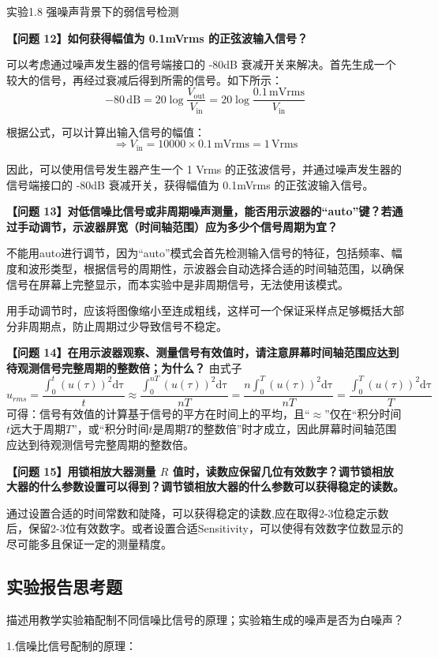 \documentclass[dvipsnames, svgnames,a4paper,11pt]{article}
\begin{document}
	实验1.8 \quad 强噪声背景下的弱信号检测

	\textbf{【问题 12】如何获得幅值为 0.1mVrms 的正弦波输入信号？}

可以考虑通过噪声发生器的信号端接口的 -80dB 衰减开关来解决。首先生成一个较大的信号，再经过衰减后得到所需的信号。如下所示：
\[
- 80 \, \mathrm{dB} = 20 \log \frac{V_{\text{out}}}{V_{\text{in}}} = 20 \log \frac{0.1 \, \mathrm{mVrms}}{V_{\text{in}}}
\]

根据公式，可以计算出输入信号的幅值：
\[
\Rightarrow V_{\text{in}} = 10000 \times 0.1 \, \mathrm{mVrms} = 1 \, \mathrm{Vrms}
\]

因此，可以使用信号发生器产生一个 1 Vrms 的正弦波信号，并通过噪声发生器的信号端接口的 -80dB 衰减开关，获得幅值为 0.1mVrms 的正弦波输入信号。

\textbf{【问题 13】对低信噪比信号或非周期噪声测量，能否用示波器的“auto”键？若通过手动调节，示波器屏宽（时间轴范围）应为多少个信号周期为宜？}

不能用auto进行调节，因为“auto”模式会首先检测输入信号的特征，包括频率、幅度和波形类型，根据信号的周期性，示波器会自动选择合适的时间轴范围，以确保信号在屏幕上完整显示，而本实验中是非周期信号，无法使用该模式。

用手动调节时，应该将图像缩小至连成粗线，这样可一个保证采样点足够概括大部分非周期点，防止周期过少导致信号不稳定。

\textbf{【问题 14】在用示波器观察、测量信号有效值时，请注意屏幕时间轴范围应达到待观测信号完整周期的整数倍；为什么？
}
由式子
\[
			u_{rms} = \frac{\int_0^{t} (u(\tau))^2 \mathrm{d\tau}}{t} \approx \frac{\int_0^{nT} (u(\tau))^2 \mathrm{d\tau}}{nT} = \frac{n\int_0^{T} (u(\tau))^2 \mathrm{d\tau}}{nT} = \frac{\int_0^{T} (u(\tau))^2 \mathrm{d\tau}}{T}
		\]
		可得：信号有效值的计算基于信号的平方在时间上的平均，且“$\approx$”仅在“积分时间$t$远大于周期$T$”，或“积分时间$t$是周期$T$的整数倍”时才成立，因此屏幕时间轴范围应达到待观测信号完整周期的整数倍。

\textbf{【问题 15】用锁相放大器测量 $R$ 值时，读数应保留几位有效数字？调节锁相放大器的什么参数设置可以得到？调节锁相放大器的什么参数可以获得稳定的读数。}

通过设置合适的时间常数和陡降，可以获得稳定的读数,应在取得2-3位稳定示数后，保留2-3位有效数字。或者设置合适Sensitivity，可以使得有效数字位数显示的尽可能多且保证一定的测量精度。


\subsection{实验报告思考题}
	\begin{question}
		描述用教学实验箱配制不同信噪比信号的原理；实验箱生成的噪声是否为白噪声？
	\end{question}
		1.信噪比信号配制的原理：
\end{document}
